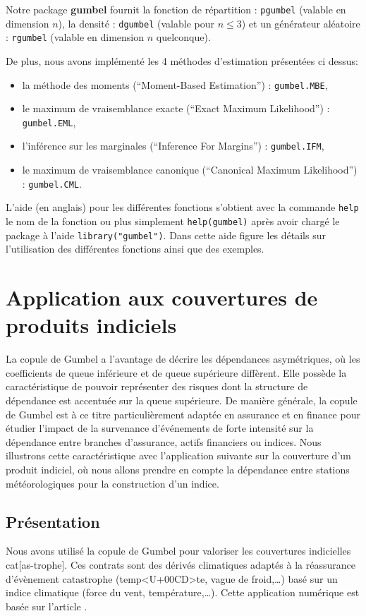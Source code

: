 \documentclass[11pt,a4paper]{article}
\newcommand{\pkg}{\textbf}
\newcommand{\code}{\texttt}
\begin{document}
Notre package \pkg{gumbel}  fournit la fonction de r\'epartition : \code{pgumbel} (valable en dimension $n$),
la densit\'e : \code{dgumbel} (valable pour $n\leq 3$) et un g\'en\'erateur al\'eatoire : \code{rgumbel} 
(valable en dimension $n$ quelconque).

De plus, nous avons impl\'ement\'e les 4 m\'ethodes d'estimation pr\'esent\'ees ci dessus:
\begin{itemize}
\item la m\'ethode des moments (``Moment-Based Estimation'') : \code{gumbel.MBE},
\item le maximum de vraisemblance exacte (``Exact Maximum Likelihood'') : \code{gumbel.EML},
\item l'inf\'erence sur les marginales (``Inference For Margins'') : \code{gumbel.IFM},
\item le maximum de vraisemblance canonique (``Canonical Maximum Likelihood'') : \code{gumbel.CML}.
\end{itemize}
L'aide (en anglais) pour les diff\'erentes fonctions s'obtient avec la commande \code{help} le nom de la fonction
ou plus simplement \code{help(gumbel)} apr\`es avoir charg\'e le package \`a l'aide \code{library("gumbel")}.
Dans cette aide figure les d\'etails sur l'utilisation des diff\'erentes fonctions ainsi que des exemples.

\section{Application aux couvertures de produits indiciels}
La copule de Gumbel a l'avantage de d\'ecrire les d\'ependances asym\'etriques, 
o\`u les coefficients de queue inf\'erieure et de queue sup\'erieure diff\`erent.
Elle poss\`ede la caract\'eristique de pouvoir repr\'esenter des risques dont la structure 
de d\'ependance est accentu\'ee sur la queue sup\'erieure. 
De mani\`ere g\'en\'erale, la copule de Gumbel est \`a ce titre particuli\`erement adapt\'ee 
en assurance et en finance pour \'etudier l'impact de la survenance d'\'ev\'enements de forte 
intensit\'e sur la d\'ependance entre branches d'assurance, actifs financiers ou indices.
Nous illustrons cette caract\'eristique avec l'application suivante sur la couverture d'un produit indiciel,
o\`u nous allons prendre en compte la d\'ependance entre stations m\'et\'eorologiques pour
la construction d'un indice.



\subsection{Pr\'esentation}
Nous avons utilis\'e la copule de Gumbel pour valoriser les couvertures indicielles cat[as-trophe]. Ces contrats sont des d\'eriv\'es
climatiques adapt\'es \`a la r\'eassurance d'\'ev\`enement catastrophe (temp<U+00CD>te, vague de froid,\dots) bas\'e sur un indice climatique
(force du vent, temp\'erature,\dots). Cette application num\'erique est bas\'ee sur l'article \cite{benfield}.
\end{document}
